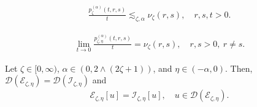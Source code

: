 \documentclass[10pt,a4paper]{amsart}
\def\ce{\mathcal{E}}
\def\ci{\mathcal{I}}
\newcommand{\D}{\mathcal{D}}
\begin{document}
\begin{align}
  \label{eq:defnuell4}
  \frac{p_\zeta^{(\alpha)}(t,r,s)}{t}
  \lesssim_{\zeta,\alpha} \nu_{\zeta}(r,s), \quad r,s,t>0.
\end{align}

  \begin{align}
    \label{eq:nuellrepulsive}
    \lim_{t\to0}\frac{p_{\zeta,\eta}^{(\alpha)}(t,r,s)}{t}
    = \nu_\zeta(r,s),\quad r,s>0,\ r\neq s.
  \end{align}

\begin{theorem}
  \label{jakprop318}
  Let $\zeta\in[0,\infty)$, $\alpha\in(0,2\wedge(2\zeta+1))$, and $\eta\in(-\alpha,0)$.
  Then, $\D(\ce_{\zeta,\eta})=\D(\ci_{\zeta,\eta})$ and
  \begin{align}
    \ce_{\zeta,\eta}[u] = \ci_{\zeta,\eta}[u],\quad u\in\D(\ce_{\zeta,\eta}).
  \end{align}
\end{theorem}
\end{document}

